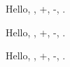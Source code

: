 \documentclass{article}
\begin{document}
Hello, , \die+, \die-, .

\large
Hello, , \die+, \die[black]-, .

\Huge
Hello, , \die+, \die-, .
\end{document}
